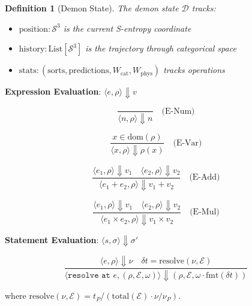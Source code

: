 \documentclass[twocolumn,10pt]{article}
\newtheorem{definition}[theorem]{Definition}
\begin{document}
\begin{definition}[Demon State]
The demon state $\mathcal{D}$ tracks:
\begin{itemize}
    \item $\text{position} : \mathcal{S}^3$ is the current S-entropy coordinate
    \item $\text{history} : \text{List}[\mathcal{S}^3]$ is the trajectory through categorical space
    \item $\text{stats} : (\text{sorts}, \text{predictions}, W_{\text{cat}}, W_{\text{phys}})$ tracks operations
\end{itemize}
\end{definition}

\textbf{Expression Evaluation}: $\langle e, \rho \rangle \Downarrow v$

\begin{equation}
    \frac{}{\langle n, \rho \rangle \Downarrow n}
    \quad \text{(E-Num)}
\end{equation}

\begin{equation}
    \frac{x \in \text{dom}(\rho)}{\langle x, \rho \rangle \Downarrow \rho(x)}
    \quad \text{(E-Var)}
\end{equation}

\begin{equation}
    \frac{\langle e_1, \rho \rangle \Downarrow v_1 \quad \langle e_2, \rho \rangle \Downarrow v_2}{\langle e_1 + e_2, \rho \rangle \Downarrow v_1 + v_2}
    \quad \text{(E-Add)}
\end{equation}

\begin{equation}
    \frac{\langle e_1, \rho \rangle \Downarrow v_1 \quad \langle e_2, \rho \rangle \Downarrow v_2}{\langle e_1 \times e_2, \rho \rangle \Downarrow v_1 \times v_2}
    \quad \text{(E-Mul)}
\end{equation}

\textbf{Statement Evaluation}: $\langle s, \sigma \rangle \Downarrow \sigma'$

\begin{equation}
    \frac{\langle e, \rho \rangle \Downarrow \nu \quad \delta t = \text{resolve}(\nu, \mathcal{E})}{\langle \texttt{resolve at } e, (\rho, \mathcal{E}, \omega) \rangle \Downarrow (\rho, \mathcal{E}, \omega \cdot \text{fmt}(\delta t))}
\end{equation}

where $\text{resolve}(\nu, \mathcal{E}) = t_P / (\text{total}(\mathcal{E}) \cdot \nu / \nu_P)$.
\end{document}
